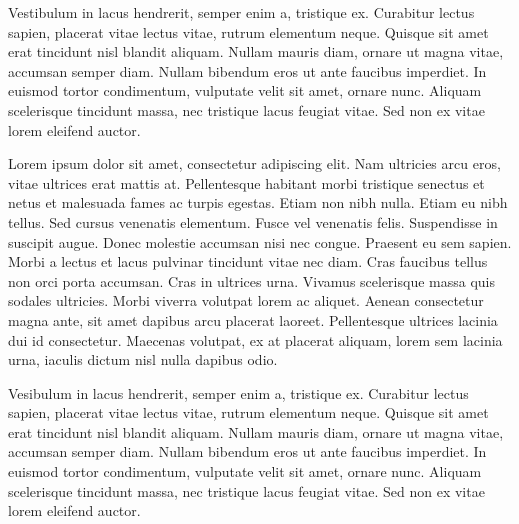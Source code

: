 \documentclass[12pt, letterpaper]{article}
\begin{document}
Vestibulum in lacus hendrerit, semper enim a, tristique ex. Curabitur lectus sapien, placerat vitae lectus vitae, rutrum elementum neque. Quisque sit amet erat tincidunt nisl blandit aliquam. Nullam mauris diam, ornare ut magna vitae, accumsan semper diam. Nullam bibendum eros ut ante faucibus imperdiet. In euismod tortor condimentum, vulputate velit sit amet, ornare nunc. Aliquam scelerisque tincidunt massa, nec tristique lacus feugiat vitae. Sed non ex vitae lorem eleifend auctor.

Lorem ipsum dolor sit amet, consectetur adipiscing elit. Nam ultricies arcu eros, vitae ultrices erat mattis at. Pellentesque habitant morbi tristique senectus et netus et malesuada fames ac turpis egestas. Etiam non nibh nulla. Etiam eu nibh tellus. Sed cursus venenatis elementum. Fusce vel venenatis felis. Suspendisse in suscipit augue. Donec molestie accumsan nisi nec congue. Praesent eu sem sapien. Morbi a lectus et lacus pulvinar tincidunt vitae nec diam.
Cras faucibus tellus non orci porta accumsan. Cras in ultrices urna. Vivamus scelerisque massa quis sodales ultricies. Morbi viverra volutpat lorem ac aliquet. Aenean consectetur magna ante, sit amet dapibus arcu placerat laoreet. Pellentesque ultrices lacinia dui id consectetur. Maecenas volutpat, ex at placerat aliquam, lorem sem lacinia urna, iaculis dictum nisl nulla dapibus odio.

Vesibulum in lacus hendrerit, semper enim a, tristique ex. Curabitur lectus sapien, placerat vitae lectus vitae, rutrum elementum neque. Quisque sit amet erat tincidunt nisl blandit aliquam. Nullam mauris diam, ornare ut magna vitae, accumsan semper diam. Nullam bibendum eros ut ante faucibus imperdiet. In euismod tortor condimentum, vulputate velit sit amet, ornare nunc. Aliquam scelerisque tincidunt massa, nec tristique lacus feugiat vitae. Sed non ex vitae lorem eleifend auctor.

\end{document}
